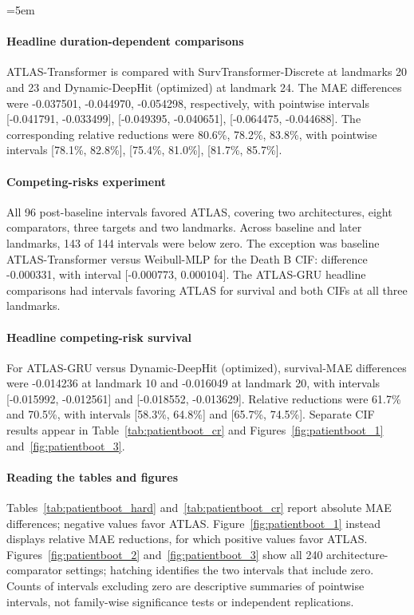 \begingroup\emergencystretch=5em
\paragraph{Headline duration-dependent comparisons} ATLAS-Transformer is compared with SurvTransformer-Discrete at landmarks 20 and 23 and Dynamic-DeepHit (optimized) at landmark 24. The MAE differences were -0.037501, -0.044970, -0.054298, respectively, with pointwise intervals [-0.041791, -0.033499], [-0.049395, -0.040651], [-0.064475, -0.044688]. The corresponding relative reductions were 80.6\%, 78.2\%, 83.8\%, with pointwise intervals [78.1\%, 82.8\%], [75.4\%, 81.0\%], [81.7\%, 85.7\%].
\par\endgroup

\paragraph{Competing-risks experiment} All 96 post-baseline intervals favored ATLAS, covering two architectures, eight comparators, three targets and two landmarks. Across baseline and later landmarks, 143 of 144 intervals were below zero. The exception was baseline ATLAS-Transformer versus Weibull-MLP for the Death B CIF: difference -0.000331, with interval [-0.000773, 0.000104]. The ATLAS-GRU headline comparisons had intervals favoring ATLAS for survival and both CIFs at all three landmarks.

\paragraph{Headline competing-risk survival} For ATLAS-GRU versus Dynamic-DeepHit (optimized), survival-MAE differences were -0.014236 at landmark 10 and -0.016049 at landmark 20, with intervals [-0.015992, -0.012561] and [-0.018552, -0.013629]. Relative reductions were 61.7\% and 70.5\%, with intervals [58.3\%, 64.8\%] and [65.7\%, 74.5\%]. Separate CIF results appear in Table~\ref{tab:patientboot_cr} and Figures~\ref{fig:patientboot_1} and~\ref{fig:patientboot_3}.

\paragraph{Reading the tables and figures} Tables~\ref{tab:patientboot_hard} and~\ref{tab:patientboot_cr} report absolute MAE differences; negative values favor ATLAS. Figure~\ref{fig:patientboot_1} instead displays relative MAE reductions, for which positive values favor ATLAS. Figures~\ref{fig:patientboot_2} and~\ref{fig:patientboot_3} show all 240 architecture-comparator settings; hatching identifies the two intervals that include zero. Counts of intervals excluding zero are descriptive summaries of pointwise intervals, not family-wise significance tests or independent replications.

